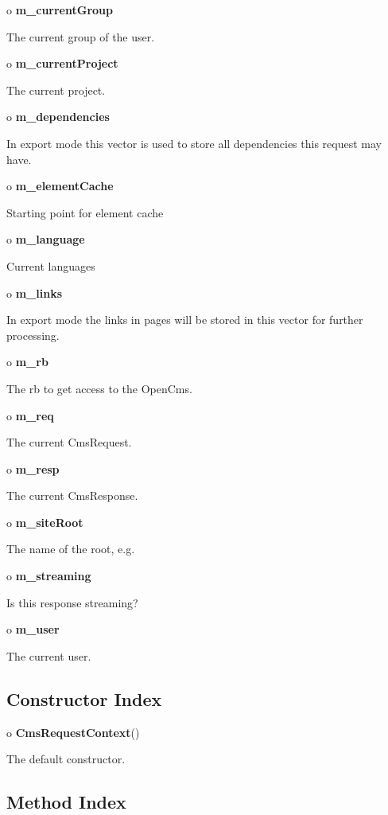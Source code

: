 \begin{description}
\item o {\bf m\_currentGroup}  

The current group of the user.  
\item o {\bf m\_currentProject}  

The current project.  
\item o {\bf m\_dependencies}  

In export mode this vector is used to store all dependencies this request may
have.  
\item o {\bf m\_elementCache}  

Starting point for element cache  
\item o {\bf m\_language}  

Current languages  
\item o {\bf m\_links}  

In export mode the links in pages will be stored in this vector for further
processing.  
\item o {\bf m\_rb}  

The rb to get access to the OpenCms.  
\item o {\bf m\_req}  

The current CmsRequest.  
\item o {\bf m\_resp}  

The current CmsResponse.  
\item o {\bf m\_siteRoot}  

The name of the root, e.g.  
\item o {\bf m\_streaming}  

Is this response streaming?  
\item o {\bf m\_user}  

The current user. 
\end{description}

\subsection*{  Constructor Index }

\begin{description}
\item o {\bf CmsRequestContext}()  

The default constructor. 
\end{description}

\subsection*{  Method Index }

